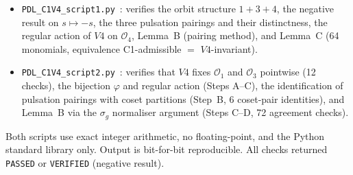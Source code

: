 \documentclass[11pt,a4paper]{article}
\def\Vfour{V4}%
\theoremstyle{plain}
\theoremstyle{definition}
\theoremstyle{remark}
\newcommand{\Vfour}{V_4}
\newcommand{\Orb}[1]{\mathcal{O}_{#1}}
\begin{document}
\begin{itemize}[leftmargin=2em]
\item \texttt{PDL\_C1V4\_script1.py}~\cite{PDL_C1V4_script1}: verifies the orbit
structure $1+3+4$, the negative result on $s \mapsto -s$, the three pulsation pairings
and their distinctness, the regular action of $\Vfour$ on $\Orb{4}$, Lemma~B (pairing
method), and Lemma~C (64 monomials, equivalence C1-admissible $=$ $\Vfour$-invariant).
\item \texttt{PDL\_C1V4\_script2.py}~\cite{PDL_C1V4_script2}: verifies that $\Vfour$
fixes $\Orb{1}$ and $\Orb{3}$ pointwise (12 checks), the bijection $\varphi$ and
regular action (Steps A--C), the identification of pulsation pairings with coset partitions
(Step~B, 6 coset-pair identities), and Lemma~B via the $\sigma_g$ normaliser argument
(Steps C--D, 72 agreement checks).
\end{itemize}

Both scripts use exact integer arithmetic, no floating-point, and the Python standard
library only. Output is bit-for-bit reproducible. All checks returned \texttt{PASSED}
or \texttt{VERIFIED} (negative result).

\clearpage


\end{document}
